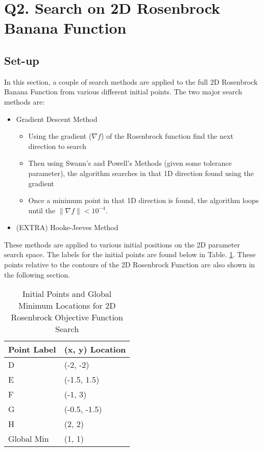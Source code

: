 \documentclass{article}
\begin{document}
    \section{Q2. Search on 2D Rosenbrock Banana Function}

    \subsection{Set-up}

    In this section, a couple of search methods are applied to the full 2D Rosenbrock Banana Function from various different initial points.
    The two major search methods are:
    \begin{itemize}
        \item Gradient Descent Method
        \begin{itemize}
            \item Using the gradient ($\nabla f$) of the Rosenbrock function find the next direction to search
            \item Then using Swann's and Powell's Methods (given some tolerance parameter), the algorithm searches in that 1D direction found using the gradient
            \item Once a minimum point in that 1D direction is found, the algorithm loops until the $\| \nabla f \| < 10^{-4}$.
        \end{itemize}
        \item (EXTRA) Hooke-Jeeves Method
    \end{itemize}

    These methods are applied to various initial positions on the 2D parameter search space. The labels for the initial points are found below in Table. \ref{tab:Q2_PointLocations}. These points relative to the contours of the 2D Rosenbrock Function are also shown in the following section.

    \begin{table}[]
        \centering
        \begin{tabular}{|l|l|}
        \hline
        \textbf{Point Label} & \textbf{(x, y) Location} \\ \hline
        D                    & (-2, -2)                 \\ \hline
        E                    & (-1.5, 1.5)              \\ \hline
        F                    & (-1, 3)                  \\ \hline
        G                    & (-0.5, -1.5)             \\ \hline
        H                    & (2, 2)                   \\ \hline
        Global Min           & (1, 1)                   \\ \hline
        \end{tabular}
        \caption{Initial Points and Global Minimum Locations for 2D Rosenbrock Objective Function Search}
        \label{tab:Q2_PointLocations}
    \end{table}
\end{document}
